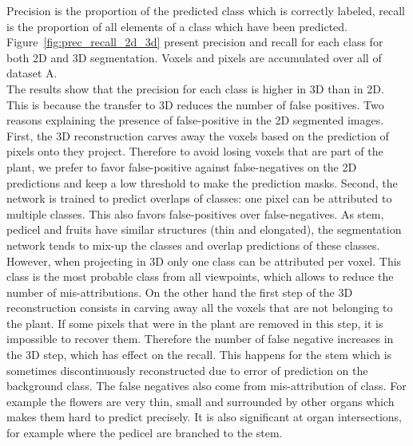 Precision is the proportion of the predicted class which is correctly labeled,
recall is the proportion of all elements of a class which have been predicted.
Figure~\ref{fig:prec_recall_2d_3d} present precision and recall for each class
for both 2D and 3D segmentation. Voxels and pixels are accumulated over all of
dataset A. \\
The results show that the precision for each class is higher in 3D than in 2D. This is because the transfer to 3D reduces the number of false positives. Two reasons explaining the presence of false-positive in the 2D segmented images. First, the 3D reconstruction carves away the voxels based on the prediction of pixels onto they project. Therefore to avoid losing voxels that are part of the plant, we prefer  to favor false-positive against false-negatives on the 2D predictions and keep a low threshold to make the prediction masks. Second, the network is trained to predict overlaps of classes: one pixel can be attributed to multiple classes. This also favors false-positives over false-negatives. As stem, pedicel and fruits have similar structures (thin and elongated), the segmentation network tends to mix-up the classes and overlap predictions of these classes. However, when projecting in 3D only one class can be attributed per voxel. This class is the most probable class from all viewpoints, which allows to reduce the number of mis-attributions. On the other hand the first step of the 3D reconstruction consists in carving away all the voxels that are not belonging to the plant. If some pixels that were in the plant are removed in this step, it is impossible to recover them. Therefore the number of false negative increases in the 3D step, which has effect on the recall. This happens for the stem which is sometimes discontinuously reconstructed due to error of prediction on the background class. The false negatives also come from mis-attribution of class. For example the flowers are very thin, small and surrounded by other organs which makes them hard to predict precisely. It is also significant at organ intersections, for example where the pedicel are branched to the stem. 

